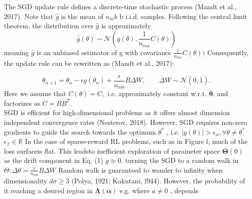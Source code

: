 \documentclass{article}
\newcounter{n}
\begin{document}
The SGD update rule defines a discrete-time stochastic process (Mandt et al., 2017). Note that  ${\hat{g}} $ is the mean of $n _mb$ b i.i.d. samples. Following the central limit theorem, the distribution over ${\hat{g}} $ is
approximately 
$$
{\hat{g}}(\theta)\sim{\mathcal{N}}(g(\theta),{\frac{1}{n_{m a}}}C(\theta)) 
$$
meaning  ${\hat{g}} $ is an unbiased estimator of g with covariance ${\frac{1}{n_{m a}}}C(\theta))$ Consequently, the update rule can be rewritten as (Mandt et al., 2017):

$$
\theta_{n+1}=\theta_{n}-\epsilon g(\theta_{n})+\frac{\epsilon}{n_{m b}}B\Delta W,\qquad\Delta W\sim\mathcal{N}(0,\bar{1}). 
$$
Here we assume that  $C(\theta)=C,$ i.e. approximately constant w.r.t. ${\boldsymbol{\theta}}.$ and factorizes as $C=B B^{T}$.  \\
SGD is efficient for high-dimensional problems as it offers almost dimension independent convergence
rates (Nesterov, 2018). However, SGD requires non-zero gradients to guide the search towards the
optimum $\theta^{*}$ , i.e. $|g(\theta)|>\epsilon_{\alpha},\forall\theta\ne\theta^{*}$  $\epsilon_{\mathcal{I}}\in\mathbb{R}$ In the case of sparse-reward RL problems, such as in Figure l, much of the loss surfaceis flat. This leadsto inefficient exploration of parameter space $\mathbf{\Theta}(0)$ as the drift component in Eq. (1) $g\approx0.$  turning the SGD to a random walk in $\Theta\colon\Delta\theta={\frac{e}{n_{m b}}}B\Delta W$ Random walk is guaranteed to wander to infinity when dimensionality $d\sigma\geq3$ (Polya, 1921; Kakutani, l944). However, the probability of it reaching a desired region in $\mathbf{\Lambda}(\mathbf{\alpha})$  e.g. where $a\neq0$ , depends \\
\hline
\\
\end{document}
